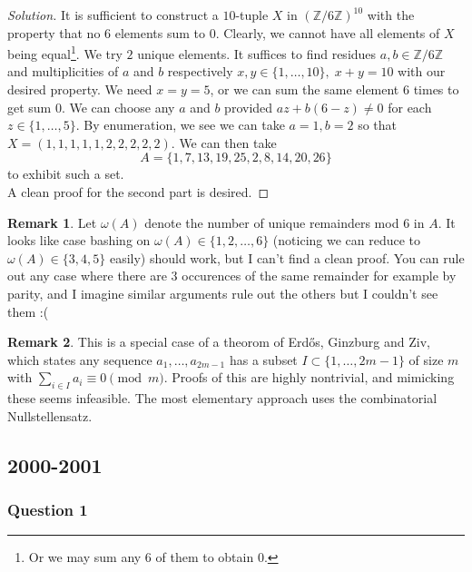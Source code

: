 \documentclass[11pt]{article}
\theoremstyle{definition}
\newtheorem*{remark}{Remark}
\begin{document}
\begin{proof}[Solution] 
  It is sufficient to construct a $10$-tuple $X$ in $(\mathbb{Z}/6\mathbb{Z})^{10}$ with the property that no $6$ 
  elements sum to $0$. Clearly, we cannot have all elements of $X$ being equal\footnote{
    Or we may sum any $6$ of them to obtain $0$.}. 
  We try $2$ unique elements. It suffices to find residues $a, b \in \mathbb{Z}/6\mathbb{Z}$ and multiplicities of 
  $a$ and $b$ respectively $x, y \in \{1, \dots, 10\}, \; x + y = 10$ with our desired property. We need $x=y=5$, or 
  we can sum the same element $6$ times to get sum $0$. We can choose any $a$ and $b$ provided
  $az + b(6-z) \neq 0$ for each $z \in \{1, \dots, 5\}$. By enumeration, we see we can take $a = 1, b = 2$ so that 
  $X = (1,1,1,1,1,2,2,2,2,2)$. We can then take \[A = \{1,7,13,19,25,2,8,14,20,26\}\] to exhibit such a set. \\ 

  A clean proof for the second part is desired. 
\end{proof}

\begin{remark}
  Let $\omega(A)$ denote the number of unique remainders mod $6$ in $A$. It looks like case bashing on
  $\omega(A) \in \{1, 2, \dots, 6\}$ (noticing we can reduce to $\omega(A) \in \{3,4,5\}$ easily) should work, 
  but I can't find a clean proof. You can rule out any case where there are $3$ occurences of the same remainder 
  for example by parity, and I imagine similar arguments rule out the others but I couldn't see them :(
\end{remark}

\begin{remark}
  This is a special case of a theorom of Erd\H{o}s, Ginzburg and Ziv, which states any sequence $a_1, \dots, a_{2m-1}$
  has a subset $I \subset \{1, \dots, 2m-1\}$ of size $m$ with $\sum_{i \in I}a_i \equiv 0 \pmod m$. Proofs of this 
  are highly nontrivial, and mimicking these seems infeasible. The most elementary approach uses the combinatorial 
  Nullstellensatz. 
\end{remark}

\newpage 

\subsection{2000-2001}

\subsubsection{Question 1}
\end{document}
